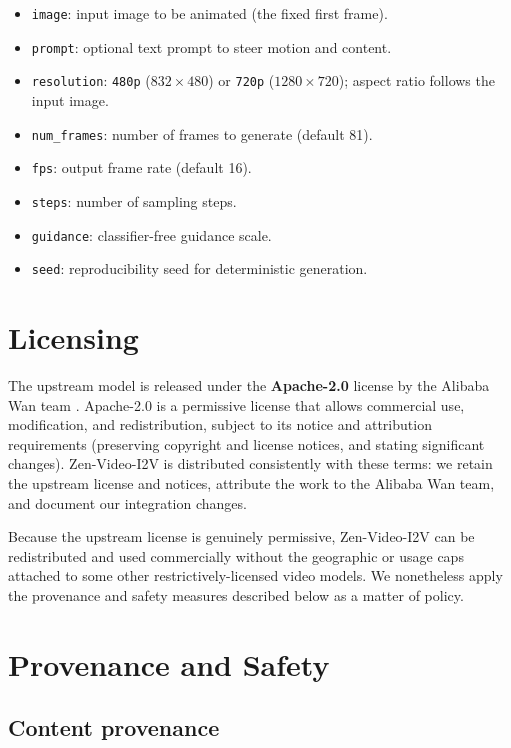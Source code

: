 \documentclass[11pt,a4paper]{article}
\begin{document}
\begin{itemize}
  \item \texttt{image}: input image to be animated (the fixed first frame).
  \item \texttt{prompt}: optional text prompt to steer motion and content.
  \item \texttt{resolution}: \texttt{480p} ($832\times 480$) or \texttt{720p} ($1280\times 720$); aspect ratio follows the input image.
  \item \texttt{num\_frames}: number of frames to generate (default 81).
  \item \texttt{fps}: output frame rate (default 16).
  \item \texttt{steps}: number of sampling steps.
  \item \texttt{guidance}: classifier-free guidance scale.
  \item \texttt{seed}: reproducibility seed for deterministic generation.
\end{itemize}

\section{Licensing}

The upstream model is released under the \textbf{Apache-2.0} license by the Alibaba Wan team \cite{wan22hf,wan22repo}. Apache-2.0 is a permissive license that allows commercial use, modification, and redistribution, subject to its notice and attribution requirements (preserving copyright and license notices, and stating significant changes). Zen-Video-I2V is distributed consistently with these terms: we retain the upstream license and notices, attribute the work to the Alibaba Wan team, and document our integration changes.

Because the upstream license is genuinely permissive, Zen-Video-I2V can be redistributed and used commercially without the geographic or usage caps attached to some other restrictively-licensed video models. We nonetheless apply the provenance and safety measures described below as a matter of policy.

\section{Provenance and Safety}
\label{sec:provenance}

\subsection{Content provenance}
\end{document}
